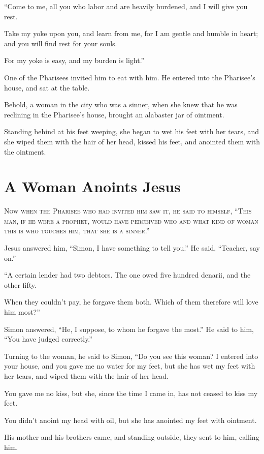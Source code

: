 “Come to me, all you who labor and are heavily burdened, and I will give you rest.

Take my yoke upon you, and learn from me, for I am gentle and humble in heart; and you will find rest for your souls.

For my yoke is easy, and my burden is light.”

One of the Pharisees invited him to eat with him. He entered into the Pharisee’s house, and sat at the table.

Behold, a woman in the city who was a sinner, when she knew that he was reclining in the Pharisee’s house, brought an alabaster jar of ointment.

Standing behind at his feet weeping, she began to wet his feet with her tears, and she wiped them with the hair of her head, kissed his feet, and anointed them with the ointment.


\clearpage \section*{A Woman Anoints Jesus}
\chapterornament

\lettrine{N}{ow when the Pharisee who had invited him saw it, he said to himself, “This man, if he were a prophet, would have perceived who and what kind of woman this is who touches him, that she is a sinner.”}

Jesus answered him, “Simon, I have something to tell you.” He said, “Teacher, say on.”

“A certain lender had two debtors. The one owed five hundred denarii, and the other fifty.

When they couldn’t pay, he forgave them both. Which of them therefore will love him most?”

Simon answered, “He, I suppose, to whom he forgave the most.” He said to him, “You have judged correctly.”

Turning to the woman, he said to Simon, “Do you see this woman? I entered into your house, and you gave me no water for my feet, but she has wet my feet with her tears, and wiped them with the hair of her head.

You gave me no kiss, but she, since the time I came in, has not ceased to kiss my feet.

You didn’t anoint my head with oil, but she has anointed my feet with ointment.

His mother and his brothers came, and standing outside, they sent to him, calling him.

